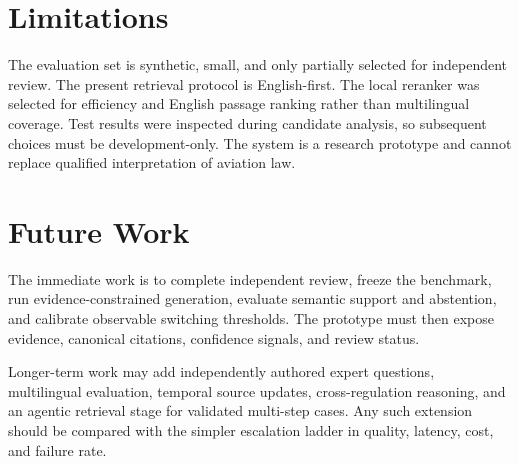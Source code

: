 \section{Limitations}

The evaluation set is synthetic, small, and only partially selected for independent review. The present retrieval protocol is English-first. The local reranker was selected for efficiency and English passage ranking rather than multilingual coverage. Test results were inspected during candidate analysis, so subsequent choices must be development-only. The system is a research prototype and cannot replace qualified interpretation of aviation law.

\section{Future Work}

The immediate work is to complete independent review, freeze the benchmark, run evidence-constrained generation, evaluate semantic support and abstention, and calibrate observable switching thresholds. The prototype must then expose evidence, canonical citations, confidence signals, and review status.

Longer-term work may add independently authored expert questions, multilingual evaluation, temporal source updates, cross-regulation reasoning, and an agentic retrieval stage for validated multi-step cases. Any such extension should be compared with the simpler escalation ladder in quality, latency, cost, and failure rate.


